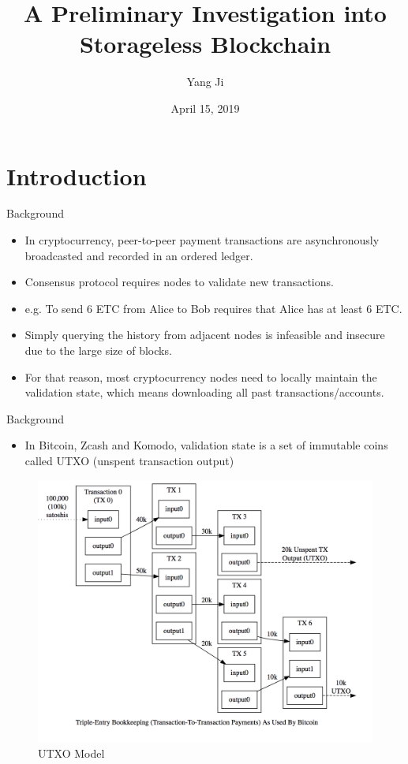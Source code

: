 \documentclass[biblatex,aspectratio=169,11pt]{mybeamer}
\title{A Preliminary Investigation into Storageless Blockchain}
\author{Yang Ji}
\date{April 15, 2019}
\begin{document}
\maketitle%
\PrintTOC%

\section{Introduction}

\begin{frame}{Background}
  \begin{itemize}[<+->]
    \item In cryptocurrency, peer-to-peer payment transactions are asynchronously broadcasted and recorded in an ordered ledger.
    \item Consensus protocol requires nodes to validate new transactions. 
    \item e.g. To send 6 ETC from Alice to Bob requires that Alice has at least 6 ETC.
    \item Simply querying the history from adjacent nodes is infeasible and insecure due to the large size of blocks.
    \item For that reason, most cryptocurrency nodes need to locally maintain the \alert{validation state}, which means downloading all past transactions/accounts.
  \end{itemize}
\end{frame}

\begin{frame}{Background}
  \begin{itemize}
    \item In Bitcoin, Zcash and Komodo, \alert{validation state} is a set of immutable coins called \alert{UTXO} (unspent transaction output)
  \end{itemize}
  \vspace{-1em}
  \begin{figure}
    \includegraphics[width=0.45\linewidth]{figs/utxo.png}
    \caption{UTXO Model}
  \end{figure}
\end{frame}
\end{document}
